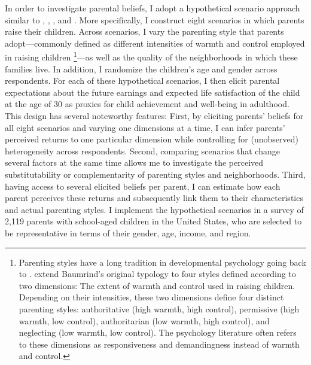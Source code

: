 \documentclass[12pt, a4paper, english]{article}
\begin{document}
In order to investigate parental beliefs, I adopt a hypothetical scenario approach similar to \citet{CunhaEloCulhane2015}, \citet{BonevaRauh2018}, \citet{Bhalotraetal2017}, and \citet{Attanasioetal2018}. More specifically, I construct eight scenarios in which parents raise their children. Across scenarios, I vary the parenting style that parents adopt---commonly defined as different intensities of warmth and control employed in raising children \citep{MaccobyMartin1983}\footnote{Parenting styles have a long tradition in developmental psychology going back to \citet{Baumrind1967}. \citet{MaccobyMartin1983} extend Baumrind's original typology to four styles defined according to two dimensions: The extent of warmth and control used in raising children. Depending on their intensities, these two dimensions define four distinct parenting styles: authoritative (high warmth, high control), permissive (high warmth, low control), authoritarian (low warmth, high control), and neglecting (low warmth, low control). The psychology literature often refers to these dimensions as responsiveness and demandingness instead of warmth and control.}---as well as the quality of the neighborhoods in which these families live. In addition, I randomize the children's age and gender across respondents. For each of these hypothetical scenarios, I then elicit parental expectations about the future earnings and expected life satisfaction of the child at the age of 30 as proxies for child achievement and well-being in adulthood. This design has several noteworthy features: First, by eliciting parents' beliefs for all eight scenarios and varying one dimensions at a time, I can infer parents' perceived returns to one particular dimension while controlling for (unobserved) heterogeneity across respondents. Second, comparing scenarios that change several factors at the same time allows me to investigate the perceived substitutability or complementarity of parenting styles and neighborhoods. Third, having access to several elicited beliefs per parent, I can estimate how each parent perceives these returns and subsequently link them to their characteristics and actual parenting styles. I implement the hypothetical scenarios in a survey of 2,119 parents with school-aged children in the United States, who are selected to be representative in terms of their gender, age, income, and region. 
\end{document}
